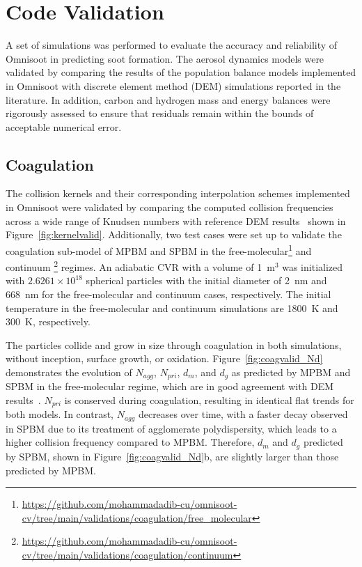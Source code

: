 \section{Code Validation}
A set of simulations was performed to evaluate the accuracy and reliability of Omnisoot in predicting soot formation. The aerosol dynamics models were validated by comparing the results of the population balance models implemented in Omnisoot with discrete element method (DEM) simulations reported in the literature. In addition, carbon and hydrogen mass and energy balances were rigorously assessed to ensure that residuals remain within the bounds of acceptable numerical error.

\subsection{Coagulation}
The collision kernels and their corresponding interpolation schemes implemented in Omnisoot were validated by comparing the computed collision frequencies across a wide range of Knudsen numbers with reference DEM results~\citep{goudeli2015coagulation} shown in Figure~\ref{fig:kernelvalid}.
Additionally, two test cases were set up to validate the coagulation sub-model of MPBM and SPBM in the free-molecular\footnote{\href{https://github.com/mohammadadib-cu/omnisoot-cv/tree/main/validations/coagulation/free_molecular}{https://github.com/mohammadadib-cu/omnisoot-cv/tree/main/validations/coagulation/free\_molecular}} and continuum \footnote{\href{https://github.com/mohammadadib-cu/omnisoot-cv/tree/main/validations/coagulation/continuum}{https://github.com/mohammadadib-cu/omnisoot-cv/tree/main/validations/coagulation/continuum}} regimes. An adiabatic CVR with a volume of 1~$\mathrm{m}^3$ was initialized with $2.6261 \times 10^{18}$ spherical particles with the initial diameter of 2~nm and 668~nm for the free-molecular and continuum cases, respectively. The initial temperature in the free-molecular and continuum simulations are 1800~K and 300~K, respectively.
 
The particles collide and grow in size through coagulation in both simulations, without inception, surface growth, or oxidation. Figure~\ref{fig:coagvalid_Nd} demonstrates the evolution of ${N_{agg}}$, ${N_{pri}}$, ${d_m}$, and ${d_g}$ as predicted by MPBM and SPBM in the free-molecular regime, which are in good agreement with DEM results~\citep{kholghy2021surface}. ${N_{pri}}$ is conserved during coagulation, resulting in identical flat trends for both models. In contrast, ${N_{agg}}$ decreases over time, with a faster decay observed in SPBM due to its treatment of agglomerate polydispersity, which leads to a higher collision frequency compared to MPBM. Therefore, $d_m$ and $d_g$  predicted by SPBM, shown in Figure~\ref{fig:coagvalid_Nd}b, are slightly larger than those predicted by MPBM.


